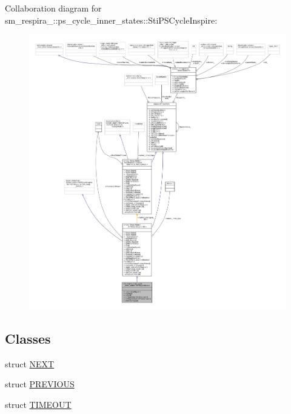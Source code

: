 Collaboration diagram for sm\+\_\+respira\+\_\+:\+:ps\+\_\+cycle\+\_\+inner\+\_\+states\+:\+:Sti\+P\+S\+Cycle\+Inspire\+:
\nopagebreak
\begin{figure}[H]
\begin{center}
\leavevmode
\includegraphics[width=350pt]{structsm__respira__1_1_1ps__cycle__inner__states_1_1StiPSCycleInspire__coll__graph}
\end{center}
\end{figure}
\subsection*{Classes}
\begin{DoxyCompactItemize}
\item 
struct \hyperlink{structsm__respira__1_1_1ps__cycle__inner__states_1_1StiPSCycleInspire_1_1NEXT}{N\+E\+XT}
\item 
struct \hyperlink{structsm__respira__1_1_1ps__cycle__inner__states_1_1StiPSCycleInspire_1_1PREVIOUS}{P\+R\+E\+V\+I\+O\+US}
\item 
struct \hyperlink{structsm__respira__1_1_1ps__cycle__inner__states_1_1StiPSCycleInspire_1_1TIMEOUT}{T\+I\+M\+E\+O\+UT}
\end{DoxyCompactItemize}
